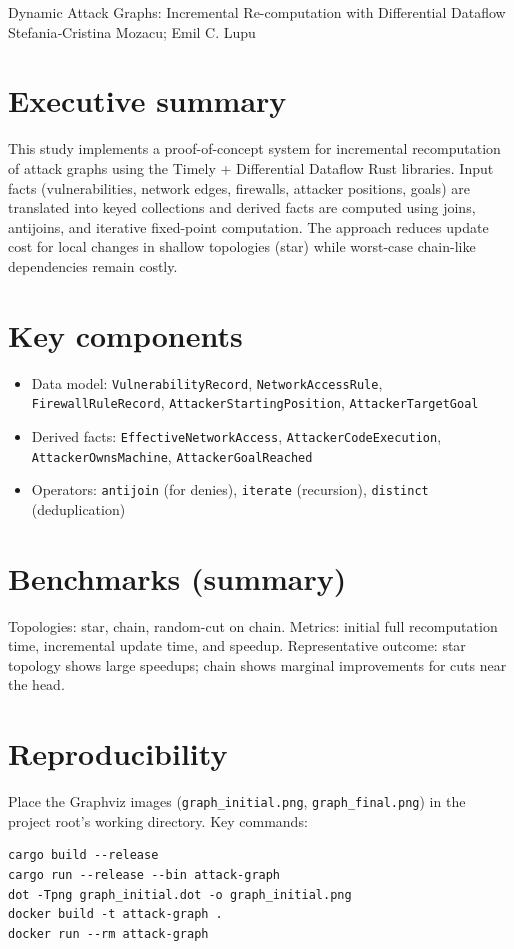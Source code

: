 \documentclass[a4paper,11pt]{article}
\begin{document}
\begin{center}
  {\LARGE Dynamic Attack Graphs: Incremental Re-computation with Differential Dataflow}\\[6pt]
  {\large Stefania‑Cristina Mozacu; Emil C. Lupu}\\[12pt]
\end{center}

\section*{Executive summary}
This study implements a proof-of-concept system for incremental recomputation of attack graphs using the Timely + Differential Dataflow Rust libraries. Input facts (vulnerabilities, network edges, firewalls, attacker positions, goals) are translated into keyed collections and derived facts are computed using joins, antijoins, and iterative fixed-point computation. The approach reduces update cost for local changes in shallow topologies (star) while worst-case chain-like dependencies remain costly.

\section*{Key components}
\begin{itemize}
\item Data model: \texttt{VulnerabilityRecord}, \texttt{NetworkAccessRule}, \texttt{FirewallRuleRecord}, \texttt{AttackerStartingPosition}, \texttt{AttackerTargetGoal}
\item Derived facts: \texttt{EffectiveNetworkAccess}, \texttt{AttackerCodeExecution}, \texttt{AttackerOwnsMachine}, \texttt{AttackerGoalReached}
\item Operators: \texttt{antijoin} (for denies), \texttt{iterate} (recursion), \texttt{distinct} (deduplication)
\end{itemize}

\section*{Benchmarks (summary)}
Topologies: star, chain, random-cut on chain. Metrics: initial full recomputation time, incremental update time, and speedup. Representative outcome: star topology shows large speedups; chain shows marginal improvements for cuts near the head.

\section*{Reproducibility}
Place the Graphviz images (\texttt{graph_initial.png}, \texttt{graph_final.png}) in the project root's working directory. Key commands:
\begin{verbatim}
cargo build --release
cargo run --release --bin attack-graph
dot -Tpng graph_initial.dot -o graph_initial.png
docker build -t attack-graph .
docker run --rm attack-graph
\end{verbatim}
\end{document}
